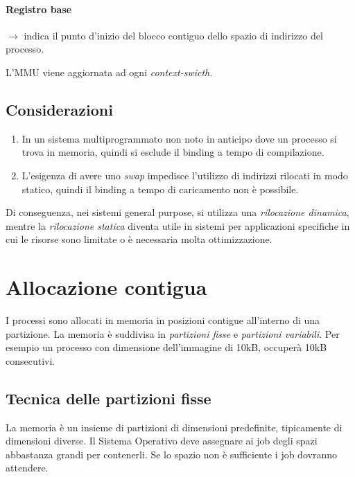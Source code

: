\documentclass[a4paper,12pt, twoside]{report}
\begin{document}
\paragraph{Registro base} $\to$ indica il punto d'inizio del blocco contiguo dello spazio di 
        indirizzo del processo.

L'MMU viene aggiornata ad ogni \emph{context-swicth}.

\subsection{Considerazioni}

\begin{enumerate}
    \item In un sistema multiprogrammato non noto in anticipo dove un processo si trova in 
        memoria, quindi si esclude il binding a tempo di compilazione. 
    \item L'esigenza di avere uno \emph{swap} impedisce l'utilizzo di indirizzi rilocati in 
        modo statico, quindi il binding a tempo di caricamento non \`e possibile. 
\end{enumerate}

Di conseguenza, nei sistemi general purpose, si utilizza una \emph{rilocazione dinamica}, 
mentre la \emph{rilocazione statica} diventa utile in sistemi per applicazioni specifiche in 
cui le risorse sono limitate o \`e necessaria molta ottimizzazione.


\section{Allocazione contigua}

I processi sono allocati in memoria in posizioni contigue all'interno di una partizione. La 
memoria \`e suddivisa in \emph{partizioni fisse} e \emph{partizioni variabili}. Per esempio 
un processo con dimensione dell'immagine di 10kB, occuper\`a 10kB consecutivi. 

\subsection{Tecnica delle partizioni fisse}

La memoria \`e un insieme di partizioni di dimensioni predefinite, tipicamente di dimensioni 
diverse. Il Sistema Operativo deve assegnare ai job degli spazi abbastanza grandi per 
contenerli. Se lo spazio non \`e sufficiente i job dovranno attendere. 
\end{document}
